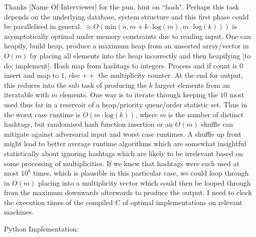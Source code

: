 Thanks [Name Of Interviewer] for the pun, hint on ``hash". Perhaps this task depends on the underlying database, system structure and this first phase could be parallelised in general. $\approx O(\text{min}(n,m+k \cdot \text{log}(m),m \cdot \text{log}(k)))$ is asymptotically optimal under memory constraints due to reading input. One can heapify, build heap, produce a maximum heap from an unsorted array/vector in $O(m)$ by placing all elements into the heap incorrectly and then heapifying [to do: implement]. Hash map from hashtags to integers. Process and if count is $0$ insert and map to $1$, else $++$ the multiplicity counter. At the end for output, this reduces into the sub task of producing the $k$ largest elements from an iteratable with $m$ elements. One way is to iterate through keeping the $10$ most used thus far in a reservoir of a heap/priority queue/order statistic set. Thus in the worst case runtime is $O(m \cdot \text{log}(k))$, where $m$ is the number of distinct hashtags, but randomised hash function insertion or an $O(m)$ shuffle can mitigate against adversarial input and worst case runtimes. A shuffle up front might lead to better average runtime algorithms which are somewhat insightful statistically about ignoring hashtags which are likely to be irrelevant based on some processing of multiplicities. If we knew that hashtags were each used at most $10^8$ times, which is plausible in this particular case, we could loop through in $O(m)$ placing into a multiplicity vector which could then be looped through from the maximum downwards afterwards to produce the output. I need to clock the execution times of the compiled C of optimal implementations on relevant machines.

Python Implementation:

